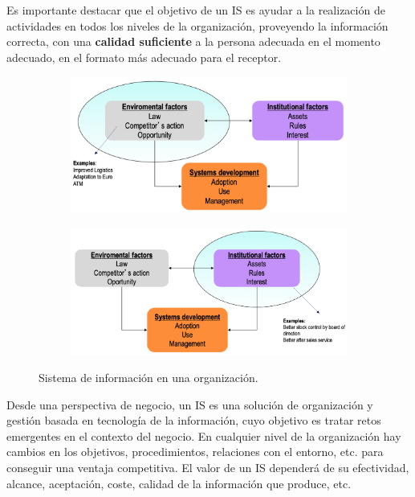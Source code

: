 Es importante destacar que el objetivo de un IS es ayudar a la realización de actividades en todos los niveles de la organización, proveyendo la información correcta, con una \textbf{calidad suficiente} a la persona adecuada en el momento adecuado, en el formato más adecuado para el receptor. \\

\begin{figure}[h]
\centering
\begin{subfigure}{.5\textwidth}
\centering
\includegraphics[width=\textwidth]{fotos/2.png}
\end{subfigure}%
\begin{subfigure}{.52\textwidth}
\centering
\includegraphics[width=\textwidth]{fotos/3.png}
\end{subfigure}
\caption{Sistema de información en una organización.}
\label{fig:sistema_info_org}
\end{figure}

Desde una perspectiva de negocio, un IS es una solución de organización y gestión basada en tecnología de la información, cuyo objetivo es tratar retos emergentes en el contexto del negocio. En cualquier nivel de la organización hay cambios en los objetivos, procedimientos, relaciones con el entorno, etc. para conseguir una ventaja competitiva. El valor de un IS dependerá de su efectividad, alcance, aceptación, coste, calidad de la información que produce, etc. \\

